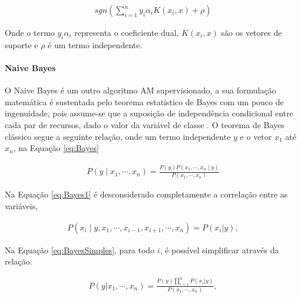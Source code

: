          \begin{equation}\label{eq:predSVM}
          \begin{aligned}
            sgn(\sum_{i=1}^{n}y_{i}\alpha_{i}K(x_{i},x)+\rho )
        \end{aligned}
        \end{equation}
        
        Onde o termo $y_{i}\alpha_{i}$ representa o coeficiente dual, $K(x_{i},x)$ são os vetores de suporte e $\rho$ é um termo independente.



        \paragraph{Naive Bayes}

        O Naive Bayes é um outro algoritmo \acrshort{AM} supervisionado, a sua formulação matemática é sustentada pelo teorema estatístico de
        Bayes com um pouco de ingenuidade, pois assume-se que a suposição de independência condicional entre cada par de recursos, dado o valor da
        variável de classe \cite{McCallum98acomparison}. O teorema de Bayes clássico segue a seguinte relação, onde um termo independente $y$ e o vetor $x_{1}$ até $x_{n}$, na Equação
        \ref{eq:Bayes}

        \begin{equation}\label{eq:Bayes}
          \begin{aligned}
            P\left ( y\mid x_{1},\cdots, x_{n} \right ) = \frac{P(y)P(x_{1},\cdots,x_{n}\mid y)}{P(x_{1},\cdots, x_{n})}
        \end{aligned}
        \end{equation}
        

        Na Equação \ref{eq:Bayes1} é desconsiderado completamente a correlação entre as variáveis, 


        \begin{equation}\label{eq:Bayes1}
          \begin{aligned}
            P\left ( x_{i}\mid y,x_{1}, \cdots,x_{i-1},x_{i+1},\cdots, x_{n} \right ) = P(x_{i}|y),
        \end{aligned}
        \end{equation}


        Na Equação \ref{eq:BayesSimples}, para todo $i$, é possível simplificar através da relação:


        \begin{equation}\label{eq:BayesSimples}
          \begin{aligned}
            P(y|x_{1},\cdots, x_{n}) = \frac{P(y)\prod_{i=1}^{n}P(x_{i}|y)}{P(x_{1},\cdots, x_{n})},
        \end{aligned}
        \end{equation}



